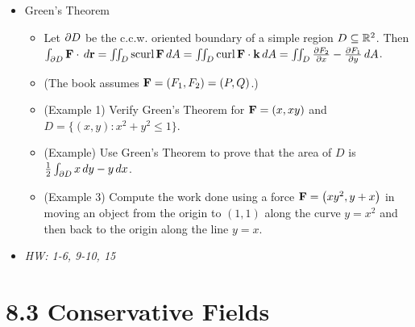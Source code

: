 \documentclass[11pt]{article}
\begin{document}
\begin{itemize}
  \item Green's Theorem
    \begin{itemize}
      \item Let \(\partial D\) be the c.c.w. oriented boundary of a simple region
        \(D\subseteq \mathbb R^2\). Then
        \(
          \int_{\partial D}\mathbf{F}\cdot\,d\mathbf{r}
            =
          \iint_D \textrm{scurl}\, \mathbf{F} \,d A
            =
          \iint_D \textrm{curl}\, \mathbf{F}\cdot \mathbf{k} \,d A
            =
          \iint_D \frac{\partial F_2}{\partial x}-\frac{\partial F_1}{\partial y}\,d A
        \).
      \item (The book assumes \(\mathbf{F}=\left(F_1,F_2\right)=\left(P,Q\right)\).)
      \item (Example 1) Verify Green's Theorem for \(\mathbf{F}=\left(x,xy\right)\)
        and \(D=\{(x,y):x^2+y^2\leq 1\}\).
      \item (Example) Use Green's Theorem to prove that the area of \(D\)
        is \(\frac{1}{2}\int_{\partial D}x\,d y-y\,d x\).
      \item (Example 3) Compute the work done using a force
        \(\mathbf{F}=\left(xy^2,y+x\right)\) in moving an object from the origin to \((1,1)\)
        along the curve \(y=x^2\) and then back to the origin along the line
        \(y=x\).
    \end{itemize}
  \item\textit{
    HW: 1-6, 9-10, 15
  }
\end{itemize}



\section*{8.3 Conservative Fields}
\end{document}
